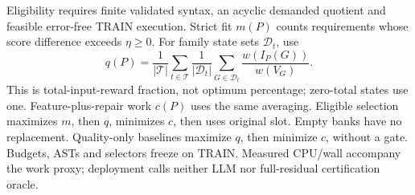 \label{sec:method:selection}
Eligibility requires finite validated syntax, an acyclic demanded quotient
and feasible error-free TRAIN execution. Strict fit $m(P)$ counts requirements
whose score difference exceeds $\eta\geq0$. For family state sets $\mathcal D_t$,
use
\begin{equation}
 q(P)=\frac1{|\mathcal T|}\sum_{t\in\mathcal T}\frac1{|\mathcal D_t|}
       \sum_{G\in\mathcal D_t}\frac{w(I_P(G))}{w(V_G)}.
 \label{eq:train-macro-quality}
\end{equation}
This is total-input-reward fraction, not optimum percentage; zero-total states
use one. Feature-plus-repair work $c(P)$ uses the same averaging. Eligible
selection maximizes $m$, then $q$, minimizes $c$, then uses original slot.
Empty banks have no replacement. Quality-only baselines maximize $q$, then
minimize $c$, without a gate. Budgets, ASTs and selectors freeze on TRAIN.
Measured CPU/wall accompany the work proxy; deployment calls neither LLM nor
full-residual certification oracle.
